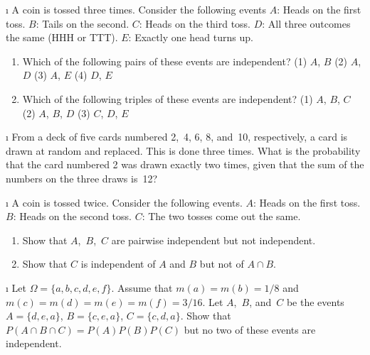 \begin{LJSItem}
\i\label{exer 4.1.5} A coin is tossed three times.  Consider the following events\newline
$A$: Heads on the first toss.\newline
$B$: Tails on the second.\newline
$C$: Heads on the third toss.\newline
$D$: All three outcomes the same (HHH or TTT).\newline
$E$: Exactly one head turns up.
\begin{enumerate}
\item Which of the following pairs of these events are independent?\newline
(1) $A$, $B$\newline
(2) $A$, $D$\newline
(3) $A$, $E$\newline
(4) $D$, $E$

\item Which of the following triples of these events are 
independent?\newline
(1) $A$, $B$, $C$\newline
(2) $A$, $B$, $D$\newline
(3) $C$, $D$, $E$
\end{enumerate}

\i\label{exer 4.1.6} From a deck of five cards numbered 2,~4, 6, 8, and~10, respectively, a
card is drawn at random and replaced.  This is done three times.  What is the
probability that the card numbered 2 was drawn exactly two times, given that
the sum of the numbers on the three draws is~12?

\i\label{exer 4.1.7} A coin is tossed twice.  Consider the
following events.\newline
$A$: Heads on the first toss.\newline
$B$: Heads on the second toss.\newline
$C$: The two tosses come out the same.
\begin{enumerate}
\item Show that $A$,~$B$,~$C$ are pairwise independent but not
independent.

\item Show that $C$ is independent of $A$ and $B$ but not of $A \cap B$.
\end{enumerate}

\i\label{exer 4.1.8} Let $\Omega = \{a,b,c,d,e,f\}$.  Assume that $m(a) = m(b) = 1/8$ and
$m(c) = m(d) = m(e) = m(f) = 3/16$.  Let $A$,~$B$, and~$C$ be the events $A = \{d,e,a\}$, 
$B = \{c,e,a\}$, $C = \{c,d,a\}$.  Show that $P(A \cap B \cap C) = P(A)P(B)P(C)$ but no two of these
events are independent.
 

\end{LJSItem}
